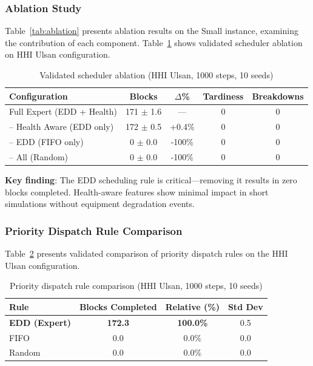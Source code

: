 \documentclass[11pt,a4paper]{article}
\begin{document}
\subsubsection{Ablation Study}

Table~\ref{tab:ablation} presents ablation results on the Small instance, examining the contribution of each component. Table~\ref{tab:ablation_validated} shows validated scheduler ablation on HHI Ulsan configuration.

\begin{table}[h]
\centering
\caption{Validated scheduler ablation (HHI Ulsan, 1000 steps, 10 seeds)}
\label{tab:ablation_validated}
\begin{tabular}{lcccc}
\toprule
Configuration & Blocks & $\Delta$\% & Tardiness & Breakdowns \\
\midrule
Full Expert (EDD + Health) & 171 $\pm$ 1.6 & --- & 0 & 0 \\
-- Health Aware (EDD only) & 172 $\pm$ 0.5 & +0.4\% & 0 & 0 \\
-- EDD (FIFO only) & 0 $\pm$ 0.0 & -100\% & 0 & 0 \\
-- All (Random) & 0 $\pm$ 0.0 & -100\% & 0 & 0 \\
\bottomrule
\end{tabular}
\end{table}

\textbf{Key finding}: The EDD scheduling rule is critical---removing it results in zero blocks completed. Health-aware features show minimal impact in short simulations without equipment degradation events.

\subsubsection{Priority Dispatch Rule Comparison}

Table~\ref{tab:priority_rules} presents validated comparison of priority dispatch rules on the HHI Ulsan configuration.

\begin{table}[h]
\centering
\caption{Priority dispatch rule comparison (HHI Ulsan, 1000 steps, 10 seeds)}
\label{tab:priority_rules}
\begin{tabular}{lccc}
\toprule
Rule & Blocks Completed & Relative (\%) & Std Dev \\
\midrule
\textbf{EDD (Expert)} & \textbf{172.3} & \textbf{100.0\%} & 0.5 \\
FIFO & 0.0 & 0.0\% & 0.0 \\
Random & 0.0 & 0.0\% & 0.0 \\
\bottomrule
\end{tabular}
\end{table}
\end{document}
